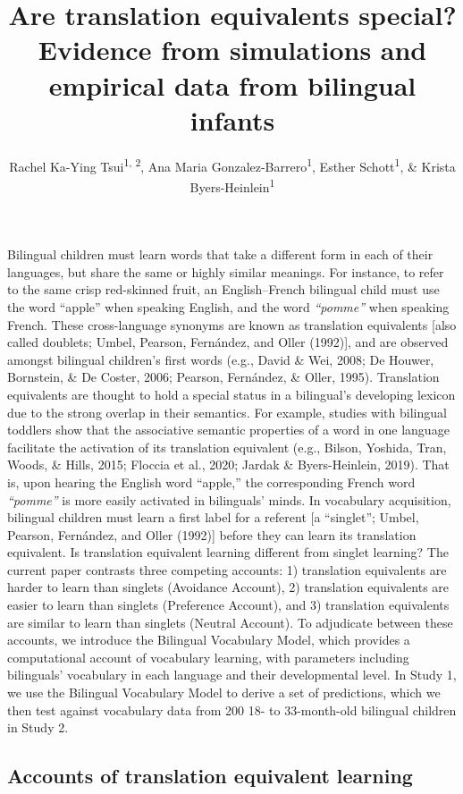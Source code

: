 \documentclass[
  english,
  ,man,floatsintext]{apa6}
\title{Are translation equivalents special? Evidence from simulations and empirical data from bilingual infants}
\author{Rachel Ka-Ying Tsui\textsuperscript{1, 2}, Ana Maria Gonzalez-Barrero\textsuperscript{1}, Esther Schott\textsuperscript{1}, \& Krista Byers-Heinlein\textsuperscript{1}}
\date{}
\affiliation{\vspace{0.5cm}\textsuperscript{1} Department of Psychology, Concordia University\\\textsuperscript{2} Laboratory for Language Development, RIKEN Center for Brain Science}
\begin{document}
\maketitle

\captionsetup[table]{labelformat=empty}

Bilingual children must learn words that take a different form in each of their languages, but share the same or highly similar meanings. For instance, to refer to the same crisp red-skinned fruit, an English--French bilingual child must use the word ``apple'' when speaking English, and the word \emph{``pomme''} when speaking French. These cross-language synonyms are known as translation equivalents {[}also called doublets; Umbel, Pearson, Fernández, and Oller (1992){]}, and are observed amongst bilingual children's first words (e.g., David \& Wei, 2008; De Houwer, Bornstein, \& De Coster, 2006; Pearson, Fernández, \& Oller, 1995). Translation equivalents are thought to hold a special status in a bilingual's developing lexicon due to the strong overlap in their semantics. For example, studies with bilingual toddlers show that the associative semantic properties of a word in one language facilitate the activation of its translation equivalent (e.g., Bilson, Yoshida, Tran, Woods, \& Hills, 2015; Floccia et al., 2020; Jardak \& Byers-Heinlein, 2019). That is, upon hearing the English word ``apple,'' the corresponding French word \emph{``pomme''} is more easily activated in bilinguals' minds. In vocabulary acquisition, bilingual children must learn a first label for a referent {[}a ``singlet''; Umbel, Pearson, Fernández, and Oller (1992){]} before they can learn its translation equivalent. Is translation equivalent learning different from singlet learning? The current paper contrasts three competing accounts: 1) translation equivalents are harder to learn than singlets (Avoidance Account), 2) translation equivalents are easier to learn than singlets (Preference Account), and 3) translation equivalents are similar to learn than singlets (Neutral Account). To adjudicate between these accounts, we introduce the Bilingual Vocabulary Model, which provides a computational account of vocabulary learning, with parameters including bilinguals' vocabulary in each language and their developmental level. In Study 1, we use the Bilingual Vocabulary Model to derive a set of predictions, which we then test against vocabulary data from 200 18- to 33-month-old bilingual children in Study 2.

\hypertarget{accounts-of-translation-equivalent-learning}{%
\subsection{Accounts of translation equivalent learning}\label{accounts-of-translation-equivalent-learning}}
\end{document}
